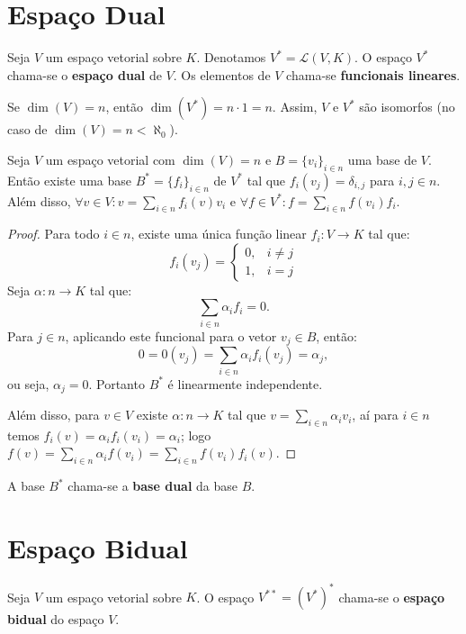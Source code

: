 \documentclass[11pt,twoside,a4paper]{book}
\begin{document}
\section{Espaço Dual}

\begin{definicao}
Seja $V$ um espaço vetorial sobre $K$. Denotamos $V^*=\mathcal{L}(V,K)$. O espaço $V^*$ chama-se o \textbf{espaço dual} de $V$. Os elementos de $V$ chama-se \textbf{funcionais lineares}.
\end{definicao}

\medskip
\noindent
Se $\dim(V)=n$, então $\dim(V^*)=n\cdot 1=n$. Assim, $V$ e $V^*$ são isomorfos (no caso de $\dim(V)=n<\aleph_0$).

\begin{teorema}
Seja $V$ um espaço vetorial com $\dim(V)=n$ e $B=\{v_i\}_{i\in n}$ uma base de $V$. Então existe uma base $B^*=\{f_i\}_{i\in n}$ de $V^*$ tal que $f_i(v_j)=\delta_{i,j}$ para $i,j\in n$. Além disso, $\forall v\in V:v=\sum_{i\in n}f_i(v)v_i$ e $\forall f\in V^*:f=\sum_{i\in n}f(v_i)f_i$.
\end{teorema}
\begin{proof}
Para todo $i\in n$, existe uma única função linear $f_i:V\rightarrow K$ tal que:
\[
f_i(v_j)=\left\{\begin{array}{rl}0,&i\neq j\\1,&i=j\end{array}\right.
\]
Seja $\alpha:n\rightarrow K$ tal que:
\[
\sum_{i\in n}\alpha_if_i=0.
\]
Para $j\in n$, aplicando este funcional para o vetor $v_j\in B$, então:
\[
0=0(v_j)=\sum_{i\in n}\alpha_if_i(v_j)=\alpha_j,
\]
ou seja, $\alpha_j=0$. Portanto $B^*$ é linearmente independente.

\medskip
\noindent
Além disso, para $v\in V$ existe $\alpha:n\rightarrow K$ tal que $v=\sum_{i\in n}\alpha_iv_i$, aí para $i\in n$ temos $f_i(v)=\alpha_if_i(v_i)=\alpha_i$; logo $f(v)=\sum_{i\in n}\alpha_if(v_i)=\sum_{i\in n}f(v_i)f_i(v)$. 
\end{proof}

\begin{definicao}
A base $B^*$ chama-se a \textbf{base dual} da base $B$.
\end{definicao}

\section{Espaço Bidual}

\begin{definicao}
Seja $V$ um espaço vetorial sobre $K$. O espaço $V^{**}=(V^*)^*$ chama-se o \textbf{espaço bidual} do espaço $V$.
\end{definicao}
\end{document}
